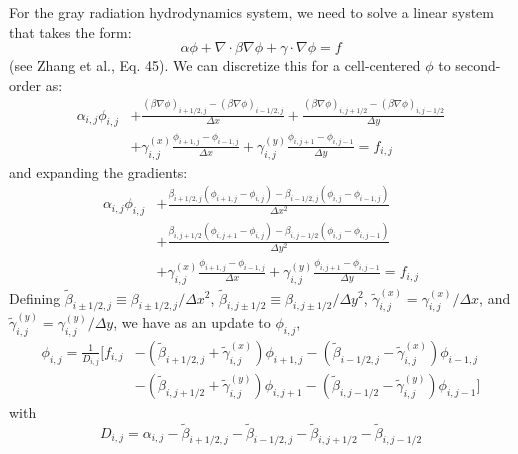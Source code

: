For the gray radiation hydrodynamics system, we need to solve a
linear system that takes the form:
\begin{equation}
  \alpha \phi + \nabla \cdot \beta \nabla \phi + \gamma \cdot \nabla \phi = f
\end{equation}
(see Zhang et al., Eq. 45). 
We can discretize this for a cell-centered $\phi$ to second-order as:
\begin{align}
  \alpha_{i,j} \phi_{i,j} &+
  \frac{(\beta \nabla \phi)_{i+1/2,j} -
        (\beta \nabla \phi)_{i-1/2,j}}{\Delta x} +
  \frac{(\beta \nabla \phi)_{i,j+1/2} -
        (\beta \nabla \phi)_{i,j-1/2}}{\Delta y} \nonumber \\
  &+
  \gamma^{(x)}_{i,j} \frac{\phi_{i+1,j} - \phi_{i-1,j}}{\Delta x} +
  \gamma^{(y)}_{i,j} \frac{\phi_{i,j+1} - \phi_{i,j-1}}{\Delta y} = f_{i,j}
\end{align}
and expanding the gradients:
\begin{align}
  \alpha_{i,j} \phi_{i,j} &+
  \frac{\beta_{i+1/2,j} (\phi_{i+1,j} - \phi_{i,j}) -
        \beta_{i-1/2,j} (\phi_{i,j} - \phi_{i-1,j})}{\Delta x^2} \nonumber \\
 &+
  \frac{\beta_{i,j+1/2} (\phi_{i,j+1} - \phi_{i,j}) -
        \beta_{i,j-1/2} (\phi_{i,j} - \phi_{i,j-1})}{\Delta y^2} \nonumber \\
  &+
  \gamma^{(x)}_{i,j} \frac{\phi_{i+1,j} - \phi_{i-1,j}}{\Delta x} +
  \gamma^{(y)}_{i,j} \frac{\phi_{i,j+1} - \phi_{i,j-1}}{\Delta y} = f_{i,j}
\end{align}
Defining $\tilde{\beta}_{i\pm1/2,j} \equiv \beta_{i\pm1/2,j}/\Delta x^2$,
$\tilde{\beta}_{i,j\pm1/2} \equiv \beta_{i,j\pm1/2}/\Delta y^2$,
$\tilde{\gamma}^{(x)}_{i,j} = \gamma^{(x)}_{i,j}/\Delta x$,
and $\tilde{\gamma}^{(y)}_{i,j} = \gamma^{(y)}_{i,j}/\Delta y$, we have
as an update to $\phi_{i,j}$,
\begin{align}
\phi_{i,j} = \frac{1}{D_{i,j}} \bigg [ f_{i,j}
  &-(\tilde{\beta}_{i+1/2,j} + \tilde{\gamma}^{(x)}_{i,j}) \phi_{i+1,j}
   -(\tilde{\beta}_{i-1/2,j} - \tilde{\gamma}^{(x)}_{i,j}) \phi_{i-1,j}
  \nonumber \\
  &-(\tilde{\beta}_{i,j+1/2} + \tilde{\gamma}^{(y)}_{i,j}) \phi_{i,j+1}
   -(\tilde{\beta}_{i,j-1/2} - \tilde{\gamma}^{(y)}_{i,j}) \phi_{i,j-1}
   \bigg ]
\end{align}
with
\begin{equation}
D_{i,j} = \alpha_{i,j} - \tilde{\beta}_{i+1/2,j} - \tilde{\beta}_{i-1/2,j}
                       - \tilde{\beta}_{i,j+1/2} - \tilde{\beta}_{i,j-1/2}
\end{equation}            

